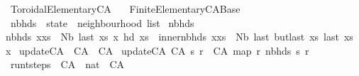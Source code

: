 %
\begin{isabellebody}%
%
%
\isadelimdocument
%
\endisadelimdocument
%
\isatagdocument
%
\isamarkuptrue%
%
\endisatagdocument
{\isafolddocument}%
%
\isadelimdocument
%
\endisadelimdocument
%
\isadelimtheory
%
\endisadelimtheory
%
\isatagtheory
{}\isamarkupfalse%
\ Toroidal{\isacharunderscore}Elementary{\isacharunderscore}CA\isanewline
\ \ \ Finite{\isacharunderscore}Elementary{\isacharunderscore}CA{\isacharunderscore}Base\isanewline
{}%
\endisatagtheory
{\isafoldtheory}%
%
\isadelimtheory
\isanewline
%
\endisadelimtheory
\isanewline
\isanewline
{}\isamarkupfalse%
\ nbhds\ {\isacharcolon}{\isacharcolon}\ {\isachardoublequoteopen}state\ {\isasymRightarrow}\ neighbourhood\ list{\isachardoublequoteclose}\ \isanewline
{\isachardoublequoteopen}nbhds\ {\isacharbrackleft}{\isacharbrackright}\ {\isacharequal}\ {\isacharbrackleft}{\isacharbrackright}{\isachardoublequoteclose}\ {\isacharbar}\ \isanewline
{\isachardoublequoteopen}nbhds\ {\isacharparenleft}x{\isacharhash}xs{\isacharparenright}\ {\isacharequal}\ {\isacharparenleft}{\isacharparenleft}Nb\ {\isacharparenleft}last\ xs{\isacharparenright}\ x\ {\isacharparenleft}hd\ xs{\isacharparenright}{\isacharparenright}\ {\isacharhash}\ {\isacharparenleft}inner{\isacharunderscore}nbhds\ {\isacharparenleft}x{\isacharhash}xs{\isacharparenright}{\isacharparenright}{\isacharparenright}\ {\isacharat}\ {\isacharbrackleft}Nb\ {\isacharparenleft}last\ {\isacharparenleft}butlast\ xs{\isacharparenright}{\isacharparenright}\ {\isacharparenleft}last\ xs{\isacharparenright}\ x{\isacharbrackright}{\isachardoublequoteclose}\isanewline
\isanewline
\isanewline
{}\isamarkupfalse%
\ update{\isacharunderscore}CA\ {\isacharcolon}{\isacharcolon}\ {\isachardoublequoteopen}CA\ {\isasymRightarrow}\ CA{\isachardoublequoteclose}\ \isanewline
{\isachardoublequoteopen}update{\isacharunderscore}CA\ {\isacharparenleft}CA\ s\ r{\isacharparenright}\ {\isacharequal}\ CA\ {\isacharparenleft}map\ r\ {\isacharparenleft}nbhds\ s{\isacharparenright}{\isacharparenright}\ r{\isachardoublequoteclose}\isanewline
\isanewline
{}\isamarkupfalse%
\ run{\isacharunderscore}t{\isacharunderscore}steps\ {\isacharcolon}{\isacharcolon}\ {\isachardoublequoteopen}CA\ {\isasymRightarrow}\ nat\ {\isasymRightarrow}\ CA{\isachardoublequoteclose}\ \isanewline

\end{isabellebody}
